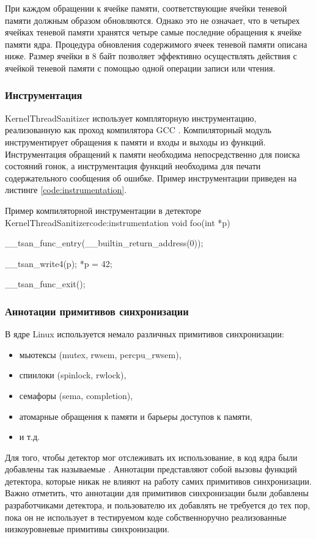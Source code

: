 При каждом обращении к ячейке памяти, соответствующие ячейки теневой памяти должным образом обновляются.
Однако это не означает, что в четырех ячейках теневой памяти хранятся четыре самые последние обращения к ячейке памяти ядра.
Процедура обновления содержимого ячеек теневой памяти описана ниже.
Размер ячейки в 8 байт позволяет эффективно осуществлять действия с ячейкой теневой памяти с помощью одной операции записи или чтения.


\subsubsection{Инструментация}

KernelThreadSanitizer использует компляторную инструментацию, реализованную как проход компилятора GCC \cite{gcc}.
Компиляторный модуль инструментирует обращения к памяти и входы и выходы из функций.
Инструментация обращений к памяти необходима непосредственно для поиска состояний гонок, а инструментация функций необходима для печати содержательного сообщения об ошибке.
Пример инструментации приведен на листинге \ref{code:instrumentation}.

\begin{listing}{Пример компиляторной инструментации в детекторе KernelThreadSanitizer}{code:instrumentation}
void foo(int *p) {
  __tsan_func_entry(__builtin_return_address(0));

  __tsan_write4(p);
  *p = 42;

  __tsan_func_exit();
}
\end{listing}


\subsubsection{Аннотации примитивов синхронизации}

В ядре Linux используется немало различных примитивов синхронизации:
\begin{itemize}
  \item мьютексы (mutex, rwsem, percpu\_rwsem),
  \item спинлоки (spinlock, rwlock),
  \item семафоры (sema, completion),
  \item атомарные обращения к памяти и барьеры доступов к памяти,
  \item и т.д.
\end{itemize}

Для того, чтобы детектор мог отслеживать их использование, в код ядра были добавлены так называемые .
Аннотации представляют собой вызовы функций детектора, которые никак не влияют на работу самих примитивов синхронизации.
Важно отметить, что аннотации для примитивов синхронизации были добавлены разработчиками детектора, и пользователю их добавлять не требуется до тех пор, пока он не использует в тестируемом коде собственноручно реализованные низкоуровневые примитивы синхронизации.

